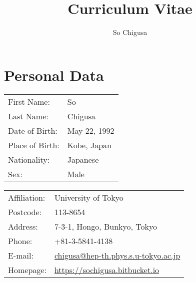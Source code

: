 \documentclass[12pt]{article}
\title{\vspace{-2cm}\textbf{Curriculum Vitae}}
\author{So Chigusa}
\begin{document}
\large
\maketitle

\newcommand{\lsim}{\stackrel{<}{_\sim}}
\newcommand{\gsim}{\stackrel{>}{_\sim}}

\newcommand{\rem}[1]{{$\spadesuit$\bf #1$\spadesuit$}}


\renewcommand{\thefootnote}{\arabic{footnote})}
\setcounter{footnote}{0}

\vspace{-5mm}
\section*{Personal Data}

\vspace{-3mm}

\begin{table}[h]
 \begin{tabular}{ll}
  First Name: & So %
      \\
  Last Name: & Chigusa %
      \\
  Date of Birth: & May 22, 1992 \\
  Place of Birth: & Kobe, Japan \\
  Nationality: & Japanese \\
  Sex: & Male \\
 \end{tabular}
\end{table}

\vspace{-5mm}
\begin{table}[h]
 \begin{tabular}{ll}
  Affiliation: & University of Tokyo \\
  Postcode: & 113-8654 \\
  Address: & 7-3-1, Hongo, Bunkyo, Tokyo \\
  Phone: & +81-3-5841-4138 \\
  E-mail: &
      \href{mailto:chigusa@hep-th.phys.s.u-tokyo.ac.jp}{chigusa@hep-th.phys.s.u-tokyo.ac.jp}
      \\
  Homepage: & \url{https://sochigusa.bitbucket.io} \\
 \end{tabular}
\end{table}
\end{document}
